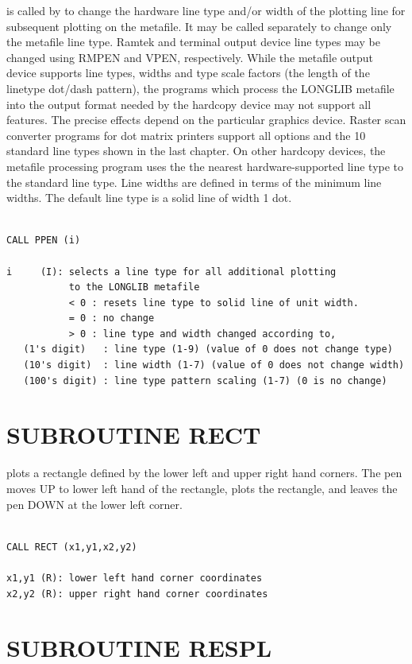 \documentclass[11pt]{report}
\begin{document}
 is called by  to change the hardware line type
and/or width of the plotting line for subsequent plotting on the
metafile.  It may be called separately to change only the metafile
line type.  Ramtek and terminal output device line types may be
changed using RMPEN and VPEN, respectively.  While the metafile output
device supports line types, widths and type scale factors (the length
of the linetype dot/dash pattern), the programs which process the
LONGLIB metafile into the output format needed by the hardcopy device
may not support all features.  The precise effects depend on the
particular graphics device.  Raster scan converter programs for dot
matrix printers support all options and the 10 standard line types
shown in the last chapter.  On other hardcopy devices, the metafile
processing program uses the the nearest hardware-supported line type
to the standard line type.  Line widths are defined in terms of the
minimum line widths.  The default line type is a solid line of width 1
dot.
\begin{verbatim}

CALL PPEN (i)

i     (I): selects a line type for all additional plotting
           to the LONGLIB metafile
           < 0 : resets line type to solid line of unit width.
           = 0 : no change
           > 0 : line type and width changed according to,
   (1's digit)   : line type (1-9) (value of 0 does not change type)
   (10's digit)  : line width (1-7) (value of 0 does not change width)
   (100's digit) : line type pattern scaling (1-7) (0 is no change)
\end{verbatim}

\section{SUBROUTINE RECT}

 plots a rectangle defined by the lower left and upper right hand
corners.  The pen moves UP to lower left hand of the rectangle, plots
the rectangle, and leaves the pen DOWN at the lower left corner.
\begin{verbatim}

CALL RECT (x1,y1,x2,y2)

x1,y1 (R): lower left hand corner coordinates
x2,y2 (R): upper right hand corner coordinates
\end{verbatim}

\section{SUBROUTINE RESPL}
\end{document}
